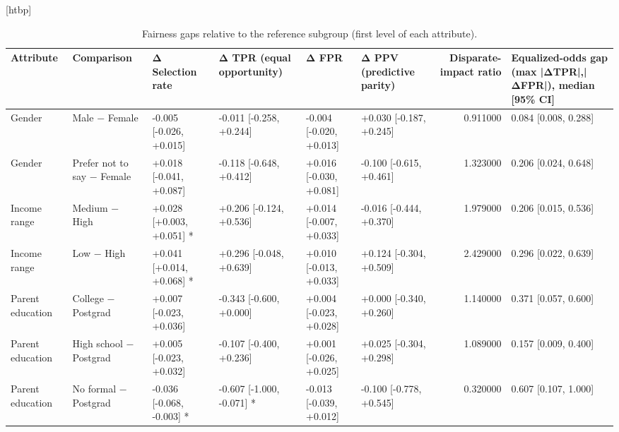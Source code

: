 \begin{table}
\small[htbp]
\caption{Fairness gaps relative to the reference subgroup (first level of each attribute).}
\label{tab:S23_fairness_gaps}
\begin{tabular}{llllllrl}
\toprule
Attribute & Comparison & Δ Selection rate & Δ TPR (equal opportunity) & Δ FPR & Δ PPV (predictive parity) & Disparate-impact ratio & Equalized-odds gap (max |ΔTPR|,|ΔFPR|), median [95\% CI] \\
\midrule
Gender & Male − Female & -0.005 [-0.026, +0.015] & -0.011 [-0.258, +0.244] & -0.004 [-0.020, +0.013] & +0.030 [-0.187, +0.245] & 0.911000 & 0.084 [0.008, 0.288] \\
Gender & Prefer not to say − Female & +0.018 [-0.041, +0.087] & -0.118 [-0.648, +0.412] & +0.016 [-0.030, +0.081] & -0.100 [-0.615, +0.461] & 1.323000 & 0.206 [0.024, 0.648] \\
Income range & Medium − High & +0.028 [+0.003, +0.051] * & +0.206 [-0.124, +0.536] & +0.014 [-0.007, +0.033] & -0.016 [-0.444, +0.370] & 1.979000 & 0.206 [0.015, 0.536] \\
Income range & Low − High & +0.041 [+0.014, +0.068] * & +0.296 [-0.048, +0.639] & +0.010 [-0.013, +0.033] & +0.124 [-0.304, +0.509] & 2.429000 & 0.296 [0.022, 0.639] \\
Parent education & College − Postgrad & +0.007 [-0.023, +0.036] & -0.343 [-0.600, +0.000] & +0.004 [-0.023, +0.028] & +0.000 [-0.340, +0.260] & 1.140000 & 0.371 [0.057, 0.600] \\
Parent education & High school − Postgrad & +0.005 [-0.023, +0.032] & -0.107 [-0.400, +0.236] & +0.001 [-0.026, +0.025] & +0.025 [-0.304, +0.298] & 1.089000 & 0.157 [0.009, 0.400] \\
Parent education & No formal − Postgrad & -0.036 [-0.068, -0.003] * & -0.607 [-1.000, -0.071] * & -0.013 [-0.039, +0.012] & -0.100 [-0.778, +0.545] & 0.320000 & 0.607 [0.107, 1.000] \\
\bottomrule
\end{tabular}
\end{table}
